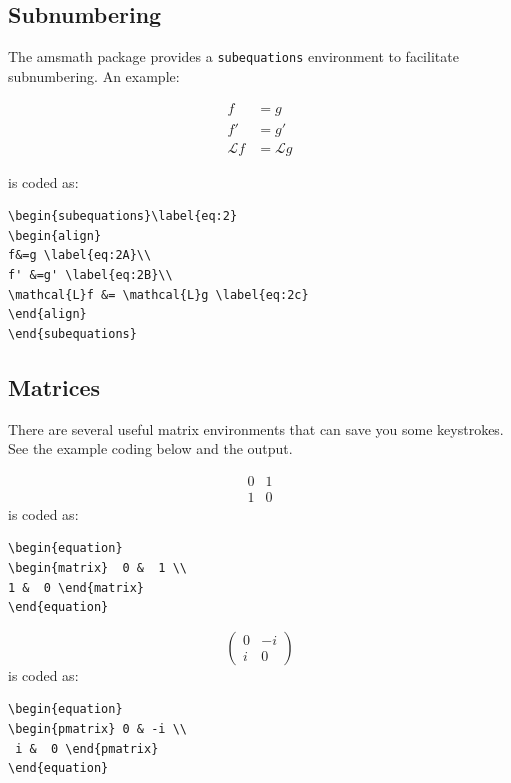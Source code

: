 \documentclass[lettersize,journal]{IEEEtran}
\begin{document}
\subsection{Subnumbering}
The amsmath package provides a {\tt{subequations}} environment to facilitate subnumbering. An example:

\begin{subequations}\label{eq:2}
\begin{align}
f&=g \label{eq:2A}\\
f' &=g' \label{eq:2B}\\
\mathcal{L}f &= \mathcal{L}g \label{eq:2c}
\end{align}
\end{subequations}

\noindent is coded as:
\begin{verbatim}
\begin{subequations}\label{eq:2}
\begin{align}
f&=g \label{eq:2A}\\
f' &=g' \label{eq:2B}\\
\mathcal{L}f &= \mathcal{L}g \label{eq:2c}
\end{align}
\end{subequations}

\end{verbatim}

\subsection{Matrices}
There are several useful matrix environments that can save you some keystrokes. See the example coding below and the output.

\begin{equation}
\begin{matrix}  0 &  1 \\ 
1 &  0 \end{matrix}
\end{equation}
is coded as:
\begin{verbatim}
\begin{equation}
\begin{matrix}  0 &  1 \\ 
1 &  0 \end{matrix}
\end{equation}
\end{verbatim}

\begin{equation}
\begin{pmatrix} 0 & -i \\
 i &  0 \end{pmatrix}
\end{equation}
is coded as:
\begin{verbatim}
\begin{equation}
\begin{pmatrix} 0 & -i \\
 i &  0 \end{pmatrix}
\end{equation}
\end{verbatim}
\end{document}
